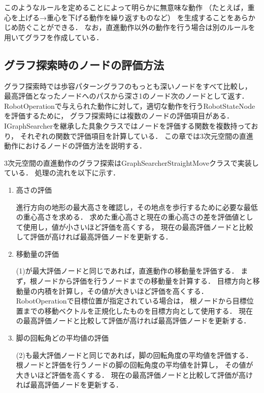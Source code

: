 このようなルールを定めることによって明らかに無意味な動作
（たとえば，重心を上げる→重心を下げる動作を繰り返すものなど）
を生成することをあらかじめ防ぐことができる．
なお，直進動作以外の動作を行う場合は別のルールを用いてグラフを作成している．

\subsection{グラフ探索時のノードの評価方法}
グラフ探索時では歩容パターングラフのもっとも深いノードをすべて比較し，
最高評価となったノードへのパスから深さ1のノード次のノードとして返す．
RobotOperationで与えられた動作に対して，適切な動作を行うRobotStateNodeを評価するために，
グラフ探索時には複数のノードの評価項目がある．
IGraphSearcherを継承した具象クラスではノードを評価する関数を複数持っており，
それぞれの関数で評価項目を計算している．
この章では3次元空間の直進動作におけるノードの評価方法を説明する．

3次元空間の直進動作のグラフ探索はGraphSearcherStraightMoveクラスで実装している．
処理の流れを以下に示す．

\begin{enumerate}
  \item 高さの評価\par
        進行方向の地形の最大高さを確認し，その地点を歩行するために必要な最低の重心高さを求める．
        求めた重心高さと現在の重心高さの差を評価値として使用し，値が小さいほど評価を高くする，
        現在の最高評価ノードと比較して評価が高ければ最高評価ノードを更新する．
  \item 移動量の評価\par
        (1)が最大評価ノードと同じであれば，直進動作の移動量を評価する．
        まず，根ノードから評価を行うノードまでの移動量を計算する．
        目標方向と移動量の内積を計算し，その値が大きいほど評価を高くする．
        RobotOperationで目標位置が指定されている場合は，
        根ノードから目標位置までの移動ベクトルを正規化したものを目標方向として使用する．
        現在の最高評価ノードと比較して評価が高ければ最高評価ノードを更新する．        
  \item 脚の回転角どの平均値の評価\par
        (2)も最大評価ノードと同じであれば，脚の回転角度の平均値を評価する．
        根ノードと評価を行うノードの脚の回転角度の平均値を計算し，
        その値が大きいほど評価を高くする．
        現在の最高評価ノードと比較して評価が高ければ最高評価ノードを更新する．
\end{enumerate}

